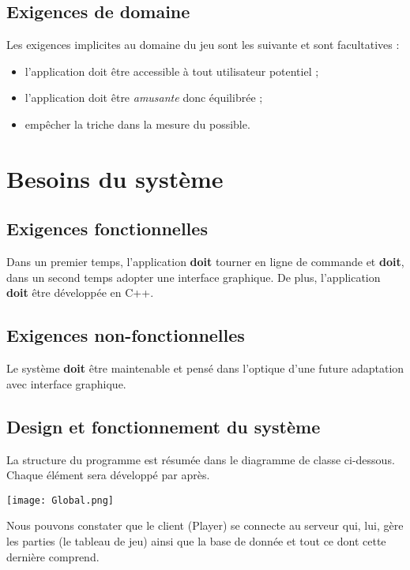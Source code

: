\documentclass{article}
\begin{document}
	\subsection{Exigences de domaine}
		Les exigences implicites au domaine du jeu sont les suivante et sont facultatives :

		\begin{itemize}
			\item l'application doit être accessible à tout utilisateur potentiel ;
			\item l'application doit être \textit{amusante} donc équilibrée ;
			\item empêcher la triche dans la mesure du possible.
		\end{itemize}

\newpage

\section{Besoins du système}
	\subsection{Exigences fonctionnelles}
		Dans un premier temps, l'application \textbf{doit} tourner en ligne de commande et \textbf{doit}, dans un second temps adopter une interface
		graphique. De plus, l'application \textbf{doit} être développée en C++.

	\subsection{Exigences non-fonctionnelles}
		Le système \textbf{doit} être maintenable et pensé dans l'optique d'une future adaptation avec interface graphique.

	\subsection{Design et fonctionnement du système}
		La structure du programme est résumée dans le diagramme de classe ci-dessous. Chaque élément sera développé par après.
		\begin{center}\texttt{[image: Global.png]}\end{center}

		Nous pouvons constater que le client (Player) se connecte au serveur qui, lui, gère les parties (le tableau de jeu) ainsi que la base de donnée et tout ce dont cette dernière comprend.
\end{document}
